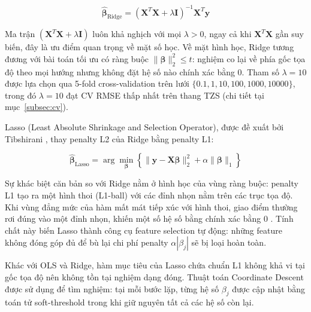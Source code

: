 \begin{equation}
    \hat{\boldsymbol{\beta}}_{\text{Ridge}} = (\mathbf{X}^T\mathbf{X} + \lambda\mathbf{I})^{-1}\mathbf{X}^T\mathbf{y}
\end{equation}

Ma trận $(\mathbf{X}^T\mathbf{X} + \lambda\mathbf{I})$ luôn khả nghịch với mọi $\lambda > 0$, ngay cả khi $\mathbf{X}^T\mathbf{X}$ gần suy biến, đây là ưu điểm quan trọng về mặt số học. Về mặt hình học, Ridge tương đương với bài toán tối ưu có ràng buộc $\|\boldsymbol{\beta}\|_2^2 \leq t$: nghiệm co lại về phía gốc tọa độ theo mọi hướng nhưng không đặt hệ số nào chính xác bằng 0. Tham số $\lambda = 10$ được lựa chọn qua 5-fold cross-validation trên lưới $\{0.1, 1, 10, 100, 1000, 10000\}$, trong đó $\lambda = 10$ đạt CV RMSE thấp nhất trên thang TZS (chi tiết tại mục~\ref{subsec:cv}).


Lasso (Least Absolute Shrinkage and Selection Operator), được đề xuất bởi Tibshirani \cite{tibshirani1996}, thay penalty L2 của Ridge bằng penalty L1:

\begin{equation}
    \hat{\boldsymbol{\beta}}_{\text{Lasso}} = \arg\min_{\boldsymbol{\beta}} \left\{ \|\mathbf{y} - \mathbf{X}\boldsymbol{\beta}\|_2^2 + \alpha\|\boldsymbol{\beta}\|_1 \right\}
\end{equation}

Sự khác biệt căn bản so với Ridge nằm ở hình học của vùng ràng buộc: penalty L1 tạo ra một hình thoi (L1-ball) với các đỉnh nhọn nằm trên các trục tọa độ. Khi vùng đẳng mức của hàm mất mát tiếp xúc với hình thoi, giao điểm thường rơi đúng vào một đỉnh nhọn, khiến một số hệ số bằng chính xác bằng 0 \cite{tibshirani1996}. Tính chất này biến Lasso thành công cụ feature selection tự động: những feature không đóng góp đủ để bù lại chi phí penalty $\alpha|\beta_j|$ sẽ bị loại hoàn toàn.

Khác với OLS và Ridge, hàm mục tiêu của Lasso chứa chuẩn L1 không khả vi tại gốc tọa độ nên không tồn tại nghiệm dạng đóng. Thuật toán Coordinate Descent được sử dụng để tìm nghiệm: tại mỗi bước lặp, từng hệ số $\beta_j$ được cập nhật bằng toán tử soft-threshold trong khi giữ nguyên tất cả các hệ số còn lại.

